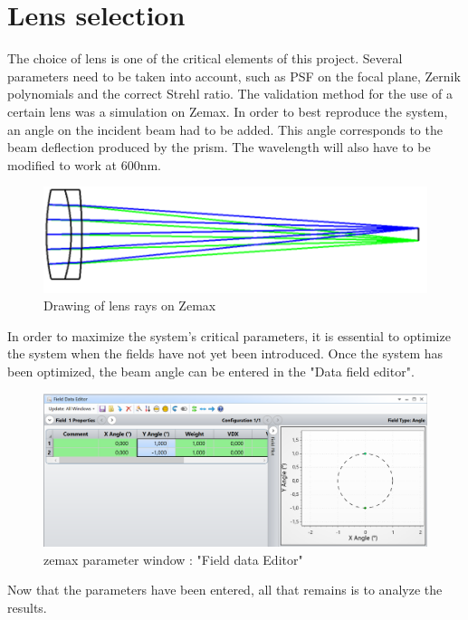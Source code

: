 \section{Lens selection}\label{sec:Opti_Lens}
The choice of lens is one of the critical elements of this project. Several parameters need to be taken
into account, such as \gls{PSF} on the focal plane, Zernik polynomials and the correct Strehl ratio.
The validation method for the use of a certain lens was a simulation on Zemax.
In order to best reproduce the system, an angle on the incident beam had to be added.
This angle corresponds to the beam deflection produced by the prism. The wavelength will also have to be modified to work at 600nm.
\begin{figure}[H]
    \centering
    \includegraphics[scale=0.8]{assets/figures/Optical Design/Zemax_RayTrace.png}
    \caption{Drawing of lens rays on Zemax}
    \label{fig:Opti_LensRayTrace}
\end{figure}
In order to maximize the system's critical parameters, it is essential to optimize the system when
the fields have not yet been introduced.
Once the system has been optimized, the beam angle can be entered in the "Data field editor".
\begin{figure}[H]
    \centering
    \includegraphics[scale=0.5]{assets/figures/Optical Design/Zemax_FieldEditor.png}
    \caption{zemax parameter window : "Field data Editor"}
    \label{fig:Opti_FieldZemax}
\end{figure}
Now that the parameters have been entered, all that remains is to analyze the results.
\newpage
